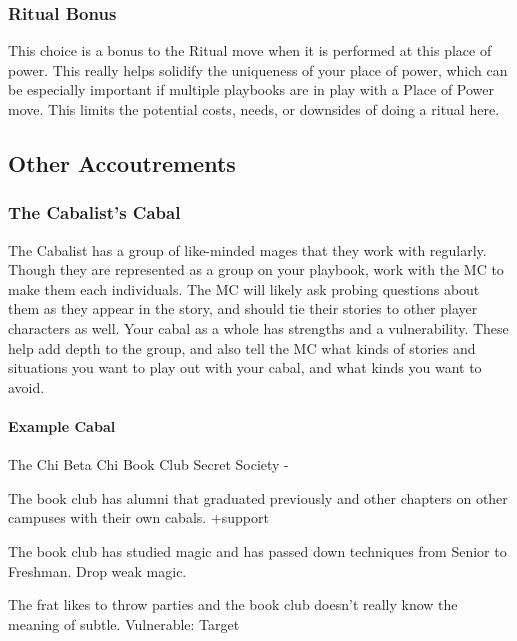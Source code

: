 \documentclass[
  oneside,
  statementpaper,
  9pt]{memoir}
\begin{document}
\hypertarget{ritual-bonus}{%
\subsubsection{Ritual Bonus}\label{ritual-bonus}}

This choice is a bonus to the Ritual move when it is performed at this
place of power. This really helps solidify the uniqueness of your place
of power, which can be especially important if multiple playbooks are in
play with a Place of Power move. This limits the potential costs, needs,
or downsides of doing a ritual here.

\hypertarget{other-accoutrements}{%
\subsection{Other Accoutrements}\label{other-accoutrements}}

\hypertarget{the-cabalists-cabal}{%
\subsubsection{The Cabalist's Cabal}\label{the-cabalists-cabal}}

The Cabalist has a group of like-minded mages that they work with
regularly. Though they are represented as a group on your playbook, work
with the MC to make them each individuals. The MC will likely ask
probing questions about them as they appear in the story, and should tie
their stories to other player characters as well. Your cabal as a whole
has strengths and a vulnerability. These help add depth to the group,
and also tell the MC what kinds of stories and situations you want to
play out with your cabal, and what kinds you want to avoid.

\hypertarget{example-cabal}{%
\paragraph{Example Cabal}\label{example-cabal}}

The Chi Beta Chi Book Club Secret Society -

The book club has alumni that graduated previously and other chapters on
other campuses with their own cabals. +support

The book club has studied magic and has passed down techniques from
Senior to Freshman. Drop weak magic.

The frat likes to throw parties and the book club doesn't really know
the meaning of subtle. Vulnerable: Target
\end{document}
